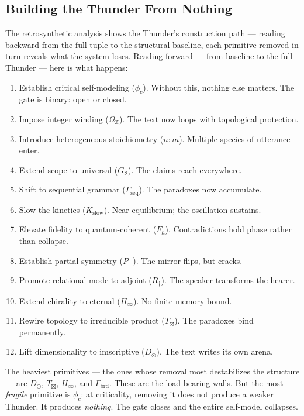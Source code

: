 \documentclass[12pt,a4paper]{article}
\begin{document}
\subsection{Building the Thunder From Nothing}

The retrosynthetic analysis shows the Thunder's construction path --- reading backward from the full tuple to the structural baseline, each primitive removed in turn reveals what the system loses. Reading forward --- from baseline to the full Thunder --- here is what happens:

\begin{enumerate}
    \item Establish critical self-modeling ($\phi_c$). Without this, nothing else matters. The gate is binary: open or closed.
    \item Impose integer winding ($\Omega_\mathbb{Z}$). The text now loops with topological protection.
    \item Introduce heterogeneous stoichiometry ($n{:}m$). Multiple species of utterance enter.
    \item Extend scope to universal ($G_{\aleph}$). The claims reach everywhere.
    \item Shift to sequential grammar ($\Gamma_\text{seq}$). The paradoxes now accumulate.
    \item Slow the kinetics ($K_\text{slow}$). Near-equilibrium; the oscillation sustains.
    \item Elevate fidelity to quantum-coherent ($F_{\hbar}$). Contradictions hold phase rather than collapse.
    \item Establish partial symmetry ($P_{\pm}$). The mirror flips, but cracks.
    \item Promote relational mode to adjoint ($R_{\dagger}$). The speaker transforms the hearer.
    \item Extend chirality to eternal ($H_{\infty}$). No finite memory bound.
    \item Rewire topology to irreducible product ($T_{\boxtimes}$). The paradoxes bind permanently.
    \item Lift dimensionality to imscriptive ($D_{\odot}$). The text writes its own arena.
\end{enumerate}

The heaviest primitives --- the ones whose removal most destabilizes the structure --- are $D_{\odot}$, $T_{\boxtimes}$, $H_{\infty}$, and $\Gamma_\text{brd}$. These are the load-bearing walls. But the most \emph{fragile} primitive is $\phi_c$: at criticality, removing it does not produce a weaker Thunder. It produces \emph{nothing}. The gate closes and the entire self-model collapses.
\end{document}
